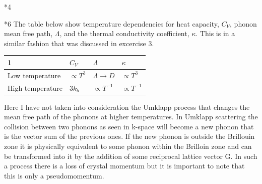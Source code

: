 \documentclass[a4paper]{article}
\begin{document}
\begin{section}
\begin{section}*{4}
	


\end{section}

\begin{section}*6
	The table below show temperature dependencies for heat capacity, $C_V$, phonon mean free path, $\Lambda$, and the thermal conductivity coefficient, $\kappa$. This is in a similar fashion that was discussed in excercise 3.
	\begin{center}
	\begin{tabular}{ | l | l | l | l | }
		\hline
		1 & $C_V$ & $\Lambda$ & $\kappa$ \\ \hline
		Low temperature & $\propto T^3$ & $\Lambda \rightarrow D$ & $\propto T^3$ \\ \hline
		High temperature & $3k_b$ & $\propto T^{-1}$ & $\propto T^{-1}$\\
		\hline
	\end{tabular}
	\end{center}
	Here I have not taken into consideration the Umklapp process that changes the mean free path of the phonons at higher temperatures. In  Umklapp scattering the collision between two phonons as seen in k-space will become a new phonon that is the vector sum of the previous ones. If the new phonon is outside the Brillouin zone it is physically equivalent to some phonon within the Brilloin zone and can be transformed into it by the addition of some reciprocal lattice vector G. In such a process there is a loss of crystal momentum but it is important to note that this is only a pseudomomentum. 
\end{section}

\end{section}
\end{document}
